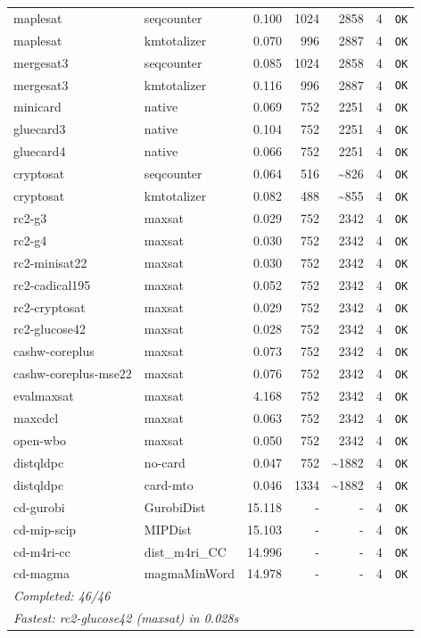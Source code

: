 \begin{longtable}{llrrrl p{}}
maplesat & seqcounter & 0.100 & 1024 & 2858 & 4 & \texttt{OK} \\
maplesat & kmtotalizer & 0.070 & 996 & 2887 & 4 & \texttt{OK} \\
mergesat3 & seqcounter & 0.085 & 1024 & 2858 & 4 & \texttt{OK} \\
mergesat3 & kmtotalizer & 0.116 & 996 & 2887 & 4 & \texttt{OK} \\
minicard & native & 0.069 & 752 & 2251 & 4 & \texttt{OK} \\
gluecard3 & native & 0.104 & 752 & 2251 & 4 & \texttt{OK} \\
gluecard4 & native & 0.066 & 752 & 2251 & 4 & \texttt{OK} \\
cryptosat & seqcounter & 0.064 & 516 & \textasciitilde{}826 & 4 & \texttt{OK} \\
cryptosat & kmtotalizer & 0.082 & 488 & \textasciitilde{}855 & 4 & \texttt{OK} \\
rc2-g3 & maxsat & 0.029 & 752 & 2342 & 4 & \texttt{OK} \\
rc2-g4 & maxsat & 0.030 & 752 & 2342 & 4 & \texttt{OK} \\
rc2-minisat22 & maxsat & 0.030 & 752 & 2342 & 4 & \texttt{OK} \\
rc2-cadical195 & maxsat & 0.052 & 752 & 2342 & 4 & \texttt{OK} \\
rc2-cryptosat & maxsat & 0.029 & 752 & 2342 & 4 & \texttt{OK} \\
rc2-glucose42 & maxsat & 0.028 & 752 & 2342 & 4 & \texttt{OK} \\
cashw-coreplus & maxsat & 0.073 & 752 & 2342 & 4 & \texttt{OK} \\
cashw-coreplus-mse22 & maxsat & 0.076 & 752 & 2342 & 4 & \texttt{OK} \\
evalmaxsat & maxsat & 4.168 & 752 & 2342 & 4 & \texttt{OK} \\
maxcdcl & maxsat & 0.063 & 752 & 2342 & 4 & \texttt{OK} \\
open-wbo & maxsat & 0.050 & 752 & 2342 & 4 & \texttt{OK} \\
distqldpc & no-card & 0.047 & 752 & \textasciitilde{}1882 & 4 & \texttt{OK} \\
distqldpc & card-mto & 0.046 & 1334 & \textasciitilde{}1882 & 4 & \texttt{OK} \\
cd-gurobi & GurobiDist & 15.118 & - & - & 4 & \texttt{OK} \\
cd-mip-scip & MIPDist & 15.103 & - & - & 4 & \texttt{OK} \\
cd-m4ri-cc & dist\_m4ri\_CC & 14.996 & - & - & 4 & \texttt{OK} \\
cd-magma & magmaMinWord & 14.978 & - & - & 4 & \texttt{OK} \\
\midrule
\multicolumn{7}{l}{\textit{Completed: 46/46}} \\
\multicolumn{7}{l}{\textit{Fastest: rc2-glucose42 (maxsat) in 0.028s}} \\
\end{longtable}
